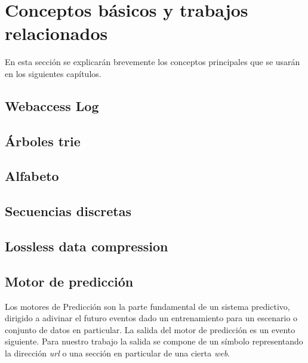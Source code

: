 \section[Conceptos Básicos]{Conceptos básicos y trabajos relacionados} \label{sec:Conceptos-Basicos}


En esta sección se explicarán brevemente los conceptos principales que se usarán en los siguientes capítulos.




\subsection{Webaccess Log}\label{concept-accesslog}
	

\subsection{Árboles trie} \label{concept-trie}

	


\subsection{Alfabeto} \label{concept-alphabet}
	

\subsection{Secuencias discretas}\label{concept-discret-seq}
	


\subsection{Lossless data compression} \label{concept-LDC}
	


\subsection{Motor de predicción}\label{concept-enginepredict}

	Los motores de Predicción son la parte fundamental de un sistema predictivo, dirigido a adivinar el futuro eventos dado un entrenamiento para un escenario o conjunto de datos en particular. La salida del motor de predicción es un evento siguiente. Para nuestro trabajo la salida se compone de un símbolo representando la dirección \emph{url} o una sección en particular de una cierta \emph{web}. 

